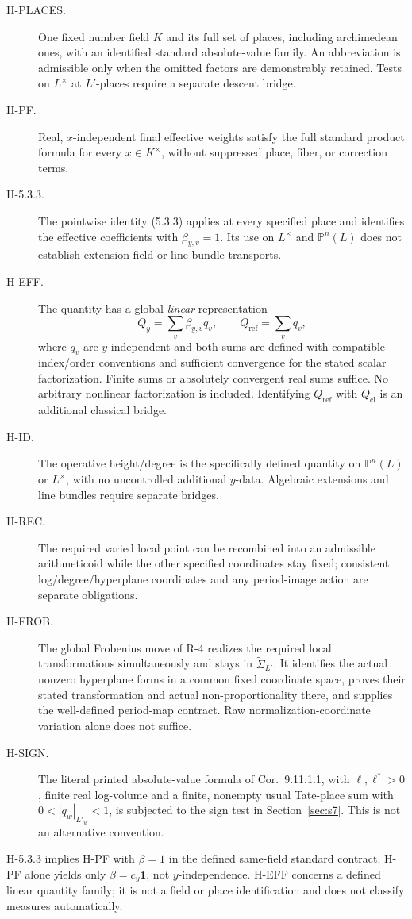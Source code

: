 \documentclass[11pt,a4paper]{article}
\theoremstyle{definition}
\theoremstyle{remark}
\begin{document}
\begin{description}
\item[H-PLACES.] One fixed number field $K$ and its full set of places,
including archimedean ones, with an identified standard absolute-value family.
An abbreviation is admissible only when the omitted factors are demonstrably
retained. Tests on $L^\times$ at $L'$-places require a separate descent bridge.
\item[H-PF.] Real, $x$-independent final effective weights satisfy the
full standard product formula for every $x\in K^\times$, without suppressed
place, fiber, or correction terms.
\item[H-5.3.3.] The pointwise identity (5.3.3) applies at every specified
place and identifies the effective coefficients with $\beta_{y,v}=1$.
Its use on $L^\times$ and $\mathbb P^n(L)$ does not establish extension-field
or line-bundle transports.
\item[H-EFF.] The quantity has a global \emph{linear} representation
\[
 Q_y=\sum_v\beta_{y,v}q_v,\qquad Q_{\mathrm{ref}}=\sum_vq_v,
\]
where $q_v$ are $y$-independent and both sums are defined with compatible
index/order conventions and sufficient convergence for the stated scalar
factorization. Finite sums or absolutely convergent real sums suffice.
No arbitrary nonlinear factorization is included. Identifying
$Q_{\mathrm{ref}}$ with $Q_{\mathrm{cl}}$ is an additional classical bridge.
\item[H-ID.] The operative height/degree is the specifically defined
quantity on $\mathbb P^n(L)$ or $L^\times$, with no uncontrolled additional
$y$-data. Algebraic extensions and line bundles require separate bridges.
\item[H-REC.] The required varied local point can be recombined into an
admissible arithmeticoid while the other specified coordinates stay fixed;
consistent log/degree/hyperplane coordinates and any period-image action
are separate obligations.
\item[H-FROB.] The global Frobenius move of R-4 realizes the required
local transformations simultaneously and stays in $\widetilde\Sigma_{L'}$.
It identifies the actual nonzero hyperplane forms in a common fixed
coordinate space, proves their stated transformation and actual
non-proportionality there, and supplies the well-defined period-map
contract. Raw normalization-coordinate variation alone does not suffice.
\item[H-SIGN.] The literal printed absolute-value formula of
Cor.~9.11.1.1, with $\ell,\ell^*>0$, finite real log-volume and a finite,
nonempty usual Tate-place sum with $0<|q_w|_{L'_w}<1$, is subjected to the
sign test in Section~\ref{sec:s7}. This is not an alternative convention.
\end{description}
H-5.3.3 implies H-PF with $\beta=1$ in the defined same-field standard
contract. H-PF alone yields only $\beta=c_y\mathbf1$, not $y$-independence.
H-EFF concerns a defined linear quantity family; it is not a field or place
identification and does not classify measures automatically.
\end{document}
